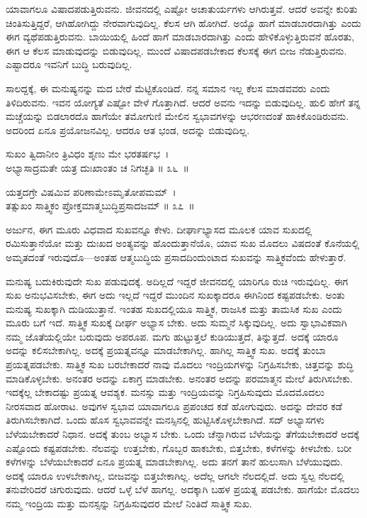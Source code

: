 ಯಾವಾಗಲೂ ವಿಷಾದಪಡುತ್ತಿರುವನು. ಜೀವನದಲ್ಲಿ ಎಷ್ಟೋ ಅಚಾತುರ್ಯಗಳು ಆಗಿರುತ್ತವೆ. ಆದರೆ ಅವನ್ನೇ ಕುರಿತು ಚಿಂತಿಸುತ್ತಿದ್ದರೆ, ಆಗಿಹೋಗಿದ್ದು ನೇರವಾಗುವುದಿಲ್ಲ. ಕೆಲಸ ಆಗಿ ಹೋಗಿದೆ. ಅಯ್ಯೊ ಹಾಗೆ ಮಾಡಬಾರದಾಗಿತ್ತು ಎಂದು ಈಗ ವ್ಯಥೆಪಡುತ್ತಿರುವನು. ಬಾಯಿಯಲ್ಲಿ ಹಿಂದೆ ಹಾಗೆ ಮಾಡಬಾರದಾಗಿತ್ತು ಎಂದು ಹೇಳಿಕೊಳ್ಳುತ್ತಿರುವನೆ ಹೊರತು, ಈಗ ಆ ಕೆಲಸ ಮಾಡುವುದನ್ನು ಬಿಡುವುದಿಲ್ಲ. ಮುಂದೆ ವಿಷಾದಪಡಬೇಕಾದ ಕೆಲಸಕ್ಕೆ ಈಗ ಬೀಜ ನೆಡುತ್ತಿರುವನು. ಎಷ್ಟಾದರೂ ಇವನಿಗೆ ಬುದ್ಧಿ ಬರುವುದಿಲ್ಲ.

ಸಾಲದ್ದಕ್ಕೆ, ಈ ಮನುಷ್ಯನನ್ನು ಮದ ಬೇರೆ ಮೆಟ್ಟಿಕೊಂಡಿದೆ. ನನ್ನ ಸಮಾನ ಇಲ್ಲ ಕೆಲಸ ಮಾಡವವರು ಎಂದು ತಿಳಿದಿರುವನು. ಇವನ ಯೋಗ್ಯತೆ ಎಷ್ಟೋ ವೇಳೆ ಗೊತ್ತಾಗಿದೆ. ಆದರೆ ಅವನು ಇದನ್ನು ಬಿಡುವುದಿಲ್ಲ. ಹುಲಿ ಹೇಗೆ ತನ್ನ ಮಚ್ಚೆಯನ್ನು ಬಿಡಲಾರದೊ ಹಾಗೆಯೇ ತಮೋಗುಣಿ ಮೇಲಿನ ಸ್ವಭಾವಗಳನ್ನು ಆಭರಣದಂತೆ ಹಾಕಿಕೊಂಡಿರುವನು. ಅದರಿಂದ ಏನೂ ಪ್ರಯೋಜನವಿಲ್ಲ. ಆದರೂ ಆತ ಭಂಡ, ಅದನ್ನು ಬಿಡುವುದಿಲ್ಲ.

\begin{shloka}
ಸುಖಂ ತ್ವಿದಾನೀಂ ತ್ರಿವಿಧಂ ಶೃಣು ಮೇ ಭರತರ್ಷಭ~।\\ಅಭ್ಯಾಸಾದ್ರಮತೇ ಯತ್ರ ದುಃಖಾಂತಂ ಚ ನಿಗಚ್ಛತಿ \hfill॥ ೩೬~॥
\end{shloka}

\begin{shloka}
ಯತ್ತದಗ್ರೇ ವಿಷಮಿವ ಪರಿಣಾಮೇಽಮೃತೋಪಮಮ್~।\\ತತ್ಸುಖಂ ಸಾತ್ತ್ವಿಕಂ ಪ್ರೋಕ್ತಮಾತ್ಮಬುದ್ಧಿಪ್ರಸಾದಜಮ್ \hfill॥ ೩೭~॥
\end{shloka}

\begin{artha}
ಅರ್ಜುನ, ಈಗ ಮೂರು ವಿಧವಾದ ಸುಖವನ್ನೂ ಕೇಳು. ದೀರ್ಘಾಭ್ಯಾಸದ ಮೂಲಕ ಯಾವ ಸುಖದಲ್ಲಿ ರಮಿಸುತ್ತಾನೆಯೋ ಮತ್ತು ದುಃಖದ ಅಂತ್ಯವನ್ನು ಹೊಂದುತ್ತಾನೆಯೊ, ಯಾವ ಸುಖ ಮೊದಲು ವಿಷದಂತೆ ಕೊನೆಯಲ್ಲಿ ಅಮೃತದಂತೆ ಇರುವುದೊ—ಅಂತಹ ಆತ್ಮಬುದ್ಧಿಯ ಪ್ರಸಾದ\-ದಿಂದುಂಟಾದ ಸುಖವನ್ನು ಸಾತ್ತ್ವಿಕವೆಂದು ಹೇಳುತ್ತಾರೆ.
\end{artha}

ಮನುಷ್ಯ ಬದುಕಿರುವುದೇ ಸುಖ ಪಡುವುದಕ್ಕೆ. ಅದಿಲ್ಲದೆ ಇದ್ದರೆ ಜೀವನದಲ್ಲಿ ಯಾರಿಗೂ ರುಚಿ ಇರುವುದಿಲ್ಲ. ಈಗ ಸುಖ ಅನುಭವಿಸಬೇಕು, ಈಗ ಅದು ಇಲ್ಲದೆ ಇದ್ದರೆ ಮುಂದಿನ ಸುಖಕ್ಕಾದರೂ ಈಗಿನಿಂದ ಕಷ್ಟಪಡಬೇಕು. ಅಂತು ಮನುಷ್ಯ ಸುಖಕ್ಕಾಗಿ ದುಡಿಯುತ್ತಾನೆ. ಇಂತಹ ಸುಖದಲ್ಲಿಯೂ ಸಾತ್ತ್ವಿಕ, ರಾಜಸಿಕ ಮತ್ತು ತಾಮಸಿಕ ಸುಖ ಎಂದು ಮೂರು ಬಗೆ ಇದೆ. ಸಾತ್ತ್ವಿಕ ಸುಖಕ್ಕೆ ದೀರ್ಘ ಅಭ್ಯಾಸ ಬೇಕು. ಅದು ಸುಮ್ಮನೆ ಸಿಕ್ಕುವುದಿಲ್ಲ. ಅದು ಸ್ವಾಭಾವಿಕವಾಗಿ ನಮ್ಮ ಜೊತೆಯಲ್ಲಿಯೇ ಬರುವುದು ಅಪರೂಪ. ಮಗು ಹುಟ್ಟುತ್ತಲೆ ಕುಡಿಯುತ್ತದೆ, ತಿನ್ನುತ್ತದೆ. ಅದಕ್ಕೆ ಯಾರೂ ಅದನ್ನು ಕಲಿಸಬೇಕಾಗಿಲ್ಲ. ಅದಕ್ಕೆ ಪ್ರಯತ್ನವನ್ನೂ ಮಾಡಬೇಕಾಗಿಲ್ಲ. ಹಾಗಿಲ್ಲ ಸಾತ್ತ್ವಿಕ ಸುಖ. ಅದಕ್ಕೆ ತುಂಬಾ ಪ್ರಯತ್ನಪಡಬೇಕು. ಸಾತ್ತ್ವಿಕ ಸುಖ ಬರಬೇಕಾದರೆ ನಾವು ಮೊದಲು ಇಂದ್ರಿಯಗಳನ್ನು ನಿಗ್ರಹಿಸಬೇಕು, ಚಿತ್ತವನ್ನು ಶುದ್ಧಿ ಮಾಡಿಕೊಳ್ಳಬೇಕು. ಅನಂತರ ಅದನ್ನು ಏಕಾಗ್ರ ಮಾಡಬೇಕು. ಅನಂತರ ಅದನ್ನು ಪರಮಾತ್ಮನ ಮೇಲೆ ತಿರುಗಿಸಬೇಕು. ಇದಕ್ಕೆಲ್ಲ ಬೇಕಾದಷ್ಟು ಪ್ರಯತ್ನ ಆವಶ್ಯಕ. ಮನಸ್ಸು ಮತ್ತು ಇಂದ್ರಿಯವನ್ನು ನಿಗ್ರಹಿಸುವುದು ಮೊದಮೊದಲು ನೀರಸವಾದ ಹೋರಾಟ. ಅವುಗಳ ಸ್ವಭಾವ ಯಾವಾಗಲೂ ಪ್ರಪಂಚದ ಕಡೆ ಹೋಗುವುದು. ಅದನ್ನು ದೇವರ ಕಡೆ ತಿರುಗಿಸಬೇಕಾಗಿದೆ. ಒಂದು ಹೊಸ ಸ್ವಭಾವವನ್ನೇ ಮನಸ್ಸಿನಲ್ಲಿ ಹುಟ್ಟಿಸಿಕೊಳ್ಳಬೇಕಾಗಿದೆ. ಸದ್ ಅಭ್ಯಾಸಗಳು ಬೆಳೆಯಬೇಕಾದರೆ ನಿಧಾನ. ಅದಕ್ಕೆ ತುಂಬ ಅಭ್ಯಾಸ ಬೇಕು. ಒಂದು ಚೆನ್ನಾಗಿರುವ ಬೆಳೆಯನ್ನು ತೆಗೆಯಬೇಕಾದರೆ ಅದಕ್ಕೆ ಎಷ್ಟೊಂದು ಕಷ್ಟಪಡಬೇಕು. ನೆಲವನ್ನು ಉತ್ತಬೇಕು, ಗೊಬ್ಬರ ಹಾಕಬೇಕು, ಬಿತ್ತಬೇಕು, ಕಳೆಗಳನ್ನು ಕೀಳಬೇಕು. ಬರೀ ಕಳೆಗಳನ್ನು ಬೆಳೆಯಬೇಕಾದರೆ ಏನೂ ಪ್ರಯತ್ನ ಮಾಡಬೇಕಾಗಿಲ್ಲ. ಅದು ತನಗೆ ತಾನೆ ಹುಲುಸಾಗಿ ಬೆಳೆಯುವುದು. ಅದಕ್ಕೆ ಯಾರೂ ಉಳಬೇಕಾಗಿಲ್ಲ, ಬೀಜವನ್ನು ಬಿತ್ತಬೇಕಾಗಿಲ್ಲ. ಅದೆಲ್ಲ ಆಗಲೇ ನೆಲದಲ್ಲಿದೆ. ಅದು ಸ್ವಲ್ಪ ನೆಲದಲ್ಲಿ ತನುವೇರಿದರೆ ಚಿಗುರುವುದು. ಆದರೆ ಒಳ್ಳೆ ಬೆಳೆ ಹಾಗಲ್ಲ. ಅದಕ್ಕಾಗಿ ಬಹಳ ಪ್ರಯತ್ನ ಪಡಬೇಕು. ಹಾಗೆಯೇ ಮೊದಲು ನಮ್ಮ ಇಂದ್ರಿಯ ಮತ್ತು ಮನಸ್ಸನ್ನು ನಿಗ್ರಹಿಸುವುದರ ಮೇಲೆ ನಿಂತಿದೆ ಸಾತ್ತ್ವಿಕ ಸುಖ.

